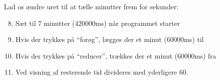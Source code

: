 \documentclass{ucph-handout}
\begin{document}
\begin{exercisebox}[adjusted title=Æggeur]
\begin{enumerate}
\end{enumerate}

Lad os ændre uret til at tælle minutter frem for sekunder:
\begin{enumerate}
\setcounter{enumi}{7}
\item Sæt  til 7 minutter (420000ms) når programmet starter
\item Hvis der trykkes på ``forøg'', lægges der et minut (60000ms) til 
\item Hvis der trykkes på ``reducer'', trækkes der et minut (60000ms) fra 
\item Ved visning af resterende tid divideres  med yderligere 60.
\end{enumerate}
\end{exercisebox}
\end{document}
